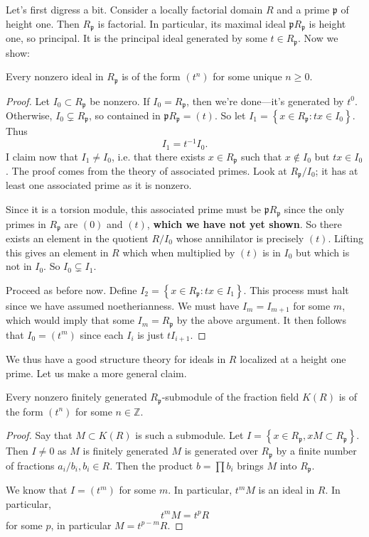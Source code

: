 Let's first digress a bit.
Consider a locally factorial domain $R$ and a prime $\mathfrak{p}$ of height
one. Then $R_{\mathfrak{p}}$ is factorial. In particular, its maximal ideal
$\mathfrak{p}R_{\mathfrak{p}}$ is height one, so principal. 
It is the principal ideal generated by some $t \in R_{\mathfrak{p}}$. 
Now we show:
\begin{proposition} 
Every nonzero ideal in $R_{\mathfrak{p}}$ is of the form $(t^n)$ for some unique $n
\geq 0$.
\end{proposition} 
\begin{proof} 
Let $I_0 \subset R_{\mathfrak{p}}$ be nonzero.  If $I_0 = R_{\mathfrak{p}}$, then
we're done---it's generated by $t^0$. Otherwise, $I_0 \subsetneq
R_{\mathfrak{p}}$, so contained in $\mathfrak{p}R_{\mathfrak{p}} = (t)$. So let
$I_1 = \left\{x \in R_{\mathfrak{p}}: tx \in I_0\right\}$. Thus 
\[ I_1 = t^{-1} I_0.  \]
I claim now that $I_1 \neq I_0$, i.e. that there exists $x \in R_{\mathfrak{p}}$ such that $x
\notin I_0$ but $tx \in I_0$. The proof comes from the theory of associated
primes.
Look at $R_{\mathfrak{p}}/I_0$; it has at least one associated prime as it is
nonzero. 

Since it
is a torsion module, this associated prime must be
$\mathfrak{p}R_{\mathfrak{p}}$ since the only primes in $R_{\mathfrak{p}}$
are $(0)$ and $(t)$, \textbf{which we have not yet shown}.  So there exists an
element in the quotient $R/I_0$ whose annihilator is precisely $(t)$. Lifting
this gives an element in $R$ which when multiplied by $(t)$ is in $I_0$ but
which is not in $I_0$. So $I_0 \subsetneq I_1$.

Proceed as before now. Define $I_2 = \left\{x  \in R_{\mathfrak{p}}: tx \in
I_1\right\}$.  This process must halt since we have assumed noetherianness. We
must have $I_m = I_{m+1}$ for some $m$, which would imply that some $I_m =
R_{\mathfrak{p}}$ by the above argument. It then follows that $I_0 = (t^m)$
since each $I_i$ is just $t I_{i+1}$. 
\end{proof} 

We thus have a good structure theory for ideals in $R$ localized at a height one prime.
Let us make a more general claim.

\begin{proposition} 
Every nonzero finitely generated $R_{\mathfrak{p}}$-submodule of the fraction field $K(R)$ is of the
form $(t^n)$ for some $n \in \mathbb{Z}$.
\end{proposition} 
\begin{proof} 
Say that $M \subset K(R)$ is such a submodule. Let $I = \left\{x \in
R_{\mathfrak{p}}, x M \subset R_{\mathfrak{p}}\right\}$. Then $I \neq 0$ as $M$
is finitely generated  $M$ is generated over $R_{\mathfrak{p}}$ by a finite number of fractions $a_i/b_i, b_i \in R$.
Then the product $b = \prod b_i$ brings $M$ into $R_{\mathfrak{p}}$. 

We know that $I = (t^m) $ for some $m$. In particular, $t^m M$ is an ideal in
$R$. In particular, 
\[ t^m M = t^p R  \]
for some $p$, in particular $M = t^{p-m}R$. 

\end{proof} 

